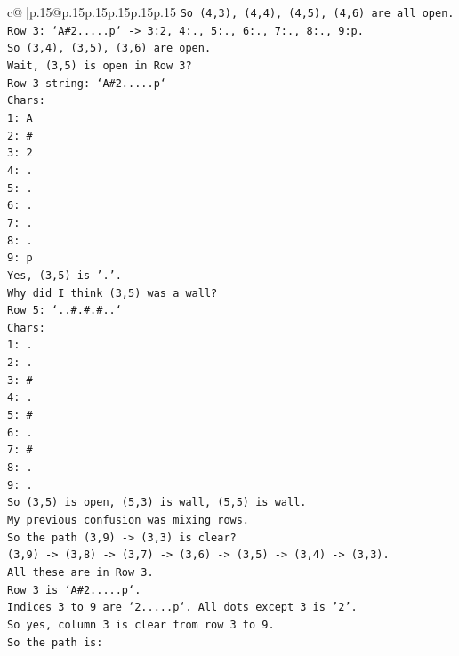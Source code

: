 \documentclass{article}
\begin{document}
{\begin{supertabular}{c@{$\;$}|p{.15\linewidth}@{}p{.15\linewidth}p{.15\linewidth}p{.15\linewidth}p{.15\linewidth}p{.15\linewidth}}
{{{\texttt{So (4,3), (4,4), (4,5), (4,6) are all open.} \\
\texttt{Row 3: `A\#2.....p` {-}> 3:2, 4:., 5:., 6:., 7:., 8:., 9:p.} \\
\texttt{So (3,4), (3,5), (3,6) are open.} \\
\texttt{Wait, (3,5) is open in Row 3?} \\
\texttt{Row 3 string: `A\#2.....p`} \\
\texttt{Chars:} \\
\texttt{1: A} \\
\texttt{2: \#} \\
\texttt{3: 2} \\
\texttt{4: .} \\
\texttt{5: .} \\
\texttt{6: .} \\
\texttt{7: .} \\
\texttt{8: .} \\
\texttt{9: p} \\
\texttt{Yes, (3,5) is '.'.} \\
\texttt{Why did I think (3,5) was a wall?} \\
\texttt{Row 5: `..\#.\#.\#..`} \\
\texttt{Chars:} \\
\texttt{1: .} \\
\texttt{2: .} \\
\texttt{3: \#} \\
\texttt{4: .} \\
\texttt{5: \#} \\
\texttt{6: .} \\
\texttt{7: \#} \\
\texttt{8: .} \\
\texttt{9: .} \\
\texttt{So (3,5) is open, (5,3) is wall, (5,5) is wall.} \\
\texttt{My previous confusion was mixing rows.} \\
\texttt{So the path (3,9) {-}> (3,3) is clear?} \\
\texttt{(3,9) {-}> (3,8) {-}> (3,7) {-}> (3,6) {-}> (3,5) {-}> (3,4) {-}> (3,3).} \\
\texttt{All these are in Row 3.} \\
\texttt{Row 3 is `A\#2.....p`.} \\
\texttt{Indices 3 to 9 are `2.....p`. All dots except 3 is '2'.} \\
\texttt{So yes, column 3 is clear from row 3 to 9.} \\
\texttt{So the path is:} \\
}}}
\end{supertabular}}
\end{document}
